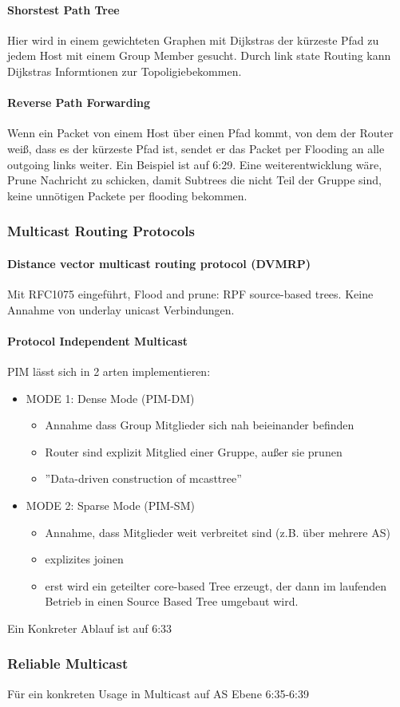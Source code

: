 			\paragraph{Shorstest Path Tree}
				Hier wird in einem gewichteten Graphen mit Dijkstras der kürzeste Pfad zu jedem Host mit einem Group Member gesucht. Durch link state Routing kann Dijkstras Informtionen zur Topoligiebekommen. 

			\paragraph{Reverse Path Forwarding}
				Wenn ein Packet von einem Host über einen Pfad kommt, von dem der Router weiß, dass es der kürzeste Pfad ist, sendet er das Packet per Flooding an alle outgoing links weiter. Ein Beispiel ist auf 6:29. Eine weiterentwicklung wäre, Prune Nachricht zu schicken, damit Subtrees die nicht Teil der Gruppe sind, keine unnötigen Packete per flooding bekommen.

		\subsubsection{Multicast Routing Protocols}
			\paragraph{Distance vector multicast routing protocol (DVMRP)}
				Mit RFC1075 eingeführt, Flood and prune: RPF source-based trees. Keine Annahme von underlay unicast Verbindungen. 
			
			\paragraph{Protocol Independent Multicast}
				PIM lässt sich in 2 arten implementieren:
				\begin{itemize}
					\item MODE 1: Dense Mode (PIM-DM)
						\begin{itemize}
							\item Annahme dass Group Mitglieder sich nah beieinander befinden 
							\item Router sind explizit Mitglied einer Gruppe, außer sie prunen
							\item ''Data-driven construction of mcasttree''
						\end{itemize}
					\item MODE 2: Sparse Mode (PIM-SM)
						\begin{itemize}
							\item Annahme, dass Mitglieder weit verbreitet sind (z.B. über mehrere AS)
							\item explizites joinen
							\item erst wird ein geteilter core-based Tree erzeugt, der dann im laufenden Betrieb in einen Source Based Tree umgebaut wird. 
						\end{itemize}
				\end{itemize}
				Ein Konkreter Ablauf ist auf 6:33

		\subsubsection{Reliable Multicast}
			Für ein konkreten Usage in Multicast auf AS Ebene 6:35-6:39
				
